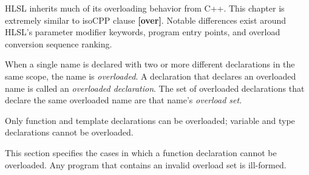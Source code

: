 
\begin{note}
HLSL inherits much of its overloading behavior from C++. This chapter is
extremely similar to \gls{isoCPP} clause \textbf{[over]}. Notable differences
exist around HLSL's parameter modifier keywords, program entry points, and
overload conversion sequence ranking.
\end{note}

\p When a single name is declared with two or more different declarations in the
same scope, the name is \textit{overloaded}. A declaration that declares an
overloaded name is called an \textit{overloaded declaration}. The set of
overloaded declarations that declare the same overloaded name are that name's
\textit{overload set}.

\p Only function and template declarations can be overloaded; variable and type
declarations cannot be overloaded.


\p This section specifies the cases in which a function declaration cannot be
overloaded. Any program that contains an invalid overload set is ill-formed.

